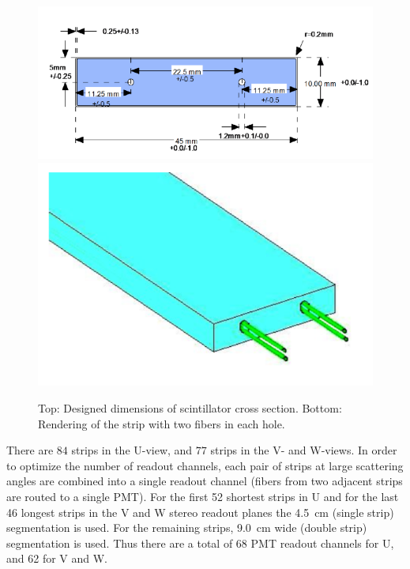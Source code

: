 \begin{figure}[hbt]
\centering
\includegraphics[width=1.05\columnwidth,keepaspectratio]{img/S3_4a.png}
\includegraphics[width=0.75\columnwidth,keepaspectratio]{img/S3_4b.png}
\caption[PCAL UVW Layers]{Top: Designed dimensions of scintillator cross section. Bottom: Rendering of the strip with two fibers in each hole.}
\label{fig:S3_4}
\end{figure}

There are $84$ strips in the U-view, and $77$ strips in the V- and W-views. In order to optimize the number of readout channels, each pair of strips at large scattering angles are combined into a single readout channel (fibers from two adjacent strips are routed to a single PMT).  For the first 52 shortest strips in U and for the last 46 longest strips in the V and W stereo readout planes the 4.5~cm (single strip) segmentation is used. For the remaining strips, 9.0~cm wide (double strip) segmentation is used.  Thus there are a total of 68 PMT readout channels for U, and 62 for V and W.




